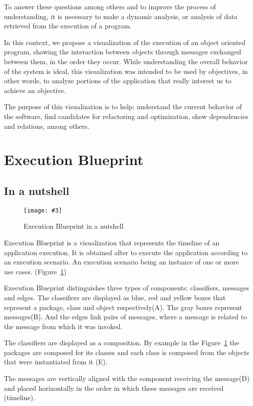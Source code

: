 \documentclass{sig-alternate}
\newcommand{\fig}[4]{
	\begin{figure}[#1]
		\centering
		\texttt{[image: \#3]}
		\caption{\label{fig:#3}#4}
	\end{figure}}
\newcommand{\seclabel}[1]{\label{sec:#1}}
\newcommand{\figref}[1]{Figure~\ref{fig:#1}}
\begin{document}
To answer these questions among others and to improve the process of understanding, it is necessary to make a dynamic analysis, or analysis of data retrieved from the execution of a program.

In this context, we propose a visualization of the execution of an object oriented program, showing the interaction between objects through messages exchanged between them, in the order they occur. While understanding the overall behavior of the system is ideal, this visualization was intended to be used by objectives, in other words, to analyze portions of the application that really interest us to achieve an objective.

The purpose of this visualization is to help: understand the current behavior of the software, find candidates for refactoring and optimization, show dependencies and relations, among others.

\section{Execution Blueprint}\seclabel{executionBlueprint}

\subsection{In a nutshell}

\fig{}{0.5}{Demo}{Execution Blueprint in a nutshell}
Execution Blueprint is a visualization that represents the timeline of an application execution. It is obtained after to execute the application according to an execution scenario. An execution scenario being an instance of one or more use cases. (\figref{Demo})

Execution Blueprint distinguishes three types of components: classifiers, messages and edges. The classifiers are displayed as blue, red and yellow boxes that represent a package, class and object respectively(A). The gray boxes represent messages(B). And the edges link pairs of messages, where a message is related to the message from which it was invoked.

The classifiers are displayed as a composition. By example in the \figref{Demo} the packages are composed for its classes  and each class is composed from the objects that were instantiated from it (E).

The messages are vertically aligned with the component receiving the message(D) and placed horizontally in the order in which these messages are received (timeline).
\end{document}

